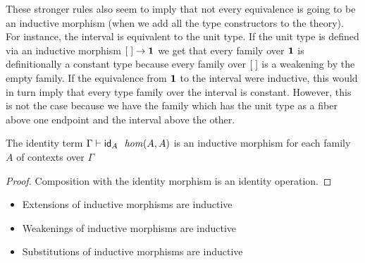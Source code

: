 \begin{rmk}
These stronger rules also seem to imply that not every equivalence is going
to be an inductive morphism (when we add all the type constructors to the
theory). For instance, the interval is equivalent to the unit type. If the
unit type is defined via an inductive morphism ${[\;]}\to\mathbf{1}$ we get that
every family over $\mathbf{1}$ is definitionally a constant type because
every family over ${[\;]}$ is a weakening by the empty family. If the
equivalence from $\mathbf{1}$ to the interval were inductive, this would in turn
imply that every type family over the interval is constant. However, this is
not the case because we have the family which has the unit type as a fiber
above one endpoint and the interval above the other.
\end{rmk}

\begin{lem}
The identity term
$\jhom{\Gamma}{A}{A}{\idtm{A}}$ is an inductive morphism
for each family $A$ of contexts over $\Gamma$
\end{lem}

\begin{proof}
Composition with the identity morphism is an identity operation.
\end{proof}

\begin{itemize}
\item Extensions of inductive morphisms are inductive
\item Weakenings of inductive morphisms are inductive
\item Substitutions of inductive morphisms are inductive
\end{itemize}
